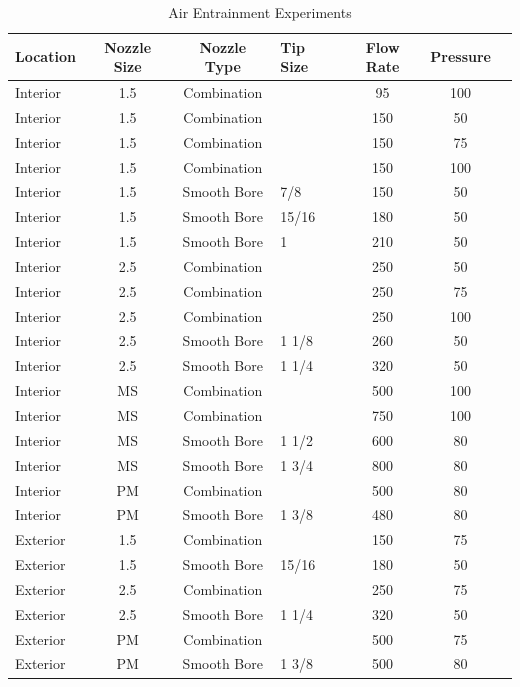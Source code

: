 \documentclass{article}
\begin{document}
\begin{table}[!ht]
\centering
\caption{Air Entrainment Experiments}\label{Total_Air_Entrainment_Experiments}
\begin{tabular}{lcclccc}
\toprule[1.5pt]
Location & Nozzle Size & Nozzle Type & Tip Size & Flow Rate & Pressure \\ 
\midrule
Interior & 1.5 & Combination &  & 95 & 100 \\
Interior & 1.5 & Combination &  & 150 & 50 \\
Interior & 1.5 & Combination &  & 150 & 75 \\
Interior & 1.5 & Combination &  & 150 & 100 \\
Interior & 1.5 & Smooth Bore & 7/8 & 150 & 50 \\
Interior & 1.5 & Smooth Bore & 15/16 & 180 & 50 \\
Interior & 1.5 & Smooth Bore & 1 & 210 & 50 \\
Interior & 2.5 & Combination &  & 250 & 50 \\
Interior & 2.5 & Combination &  & 250 & 75 \\
Interior & 2.5 & Combination &  & 250 & 100 \\
Interior & 2.5 & Smooth Bore & 1 1/8 & 260 & 50 \\
Interior & 2.5 & Smooth Bore & 1 1/4 & 320 & 50 \\
Interior & MS & Combination &  & 500 & 100 \\
Interior & MS & Combination &  & 750 & 100 \\
Interior & MS & Smooth Bore & 1 1/2 & 600 & 80 \\
Interior & MS & Smooth Bore & 1 3/4 & 800 & 80 \\
Interior & PM & Combination &  & 500 & 80 \\
Interior & PM & Smooth Bore & 1 3/8 & 480 & 80 \\
Exterior & 1.5 & Combination &  & 150 & 75 \\
Exterior & 1.5 & Smooth Bore & 15/16 & 180 & 50 \\
Exterior & 2.5 & Combination &  & 250 & 75 \\
Exterior & 2.5 & Smooth Bore & 1 1/4 & 320 & 50 \\
Exterior & PM & Combination &  & 500 & 75 \\
Exterior & PM & Smooth Bore & 1 3/8 & 500 & 80 \\ 
\bottomrule[1.25pt]
\end{tabular}
\end{table}
\end{document}
